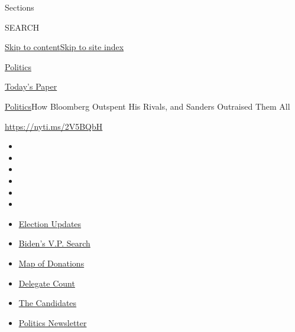 Sections

SEARCH

\protect\hyperlink{site-content}{Skip to
content}\protect\hyperlink{site-index}{Skip to site index}

\href{https://www.nytimes.com/section/politics}{Politics}

\href{https://myaccount.nytimes.com/auth/login?response_type=cookie\&client_id=vi}{}

\href{https://www.nytimes.com/section/todayspaper}{Today's Paper}

\href{/section/politics}{Politics}\textbar{}How Bloomberg Outspent His
Rivals, and Sanders Outraised Them All

\url{https://nyti.ms/2V5BQbH}

\begin{itemize}
\item
\item
\item
\item
\item
\item
\end{itemize}

\begin{itemize}
\item
  \href{https://www.nytimes.com/2020/07/31/us/elections/biden-vs-trump.html?action=click\&pgtype=Article\&state=default\&region=TOP_BANNER\&context=storylines_menu}{Election
  Updates}
\item
  \href{https://www.nytimes.com/article/biden-vice-president-2020.html?action=click\&pgtype=Article\&state=default\&region=TOP_BANNER\&context=storylines_menu}{Biden's
  V.P. Search}
\item
  \href{https://www.nytimes.com/interactive/2020/07/24/us/politics/trump-biden-campaign-donors.html?action=click\&pgtype=Article\&state=default\&region=TOP_BANNER\&context=storylines_menu}{Map
  of Donations}
\item
  \href{https://www.nytimes.com/interactive/2020/us/elections/delegate-count-primary-results.html?action=click\&pgtype=Article\&state=default\&region=TOP_BANNER\&context=storylines_menu}{Delegate
  Count}
\item
  \href{https://www.nytimes.com/interactive/2019/us/politics/2020-presidential-candidates.html?action=click\&pgtype=Article\&state=default\&region=TOP_BANNER\&context=storylines_menu}{The
  Candidates}
\item
  \href{https://www.nytimes.com/newsletters/politics?action=click\&pgtype=Article\&state=default\&region=TOP_BANNER\&context=storylines_menu}{Politics
  Newsletter}
\end{itemize}

